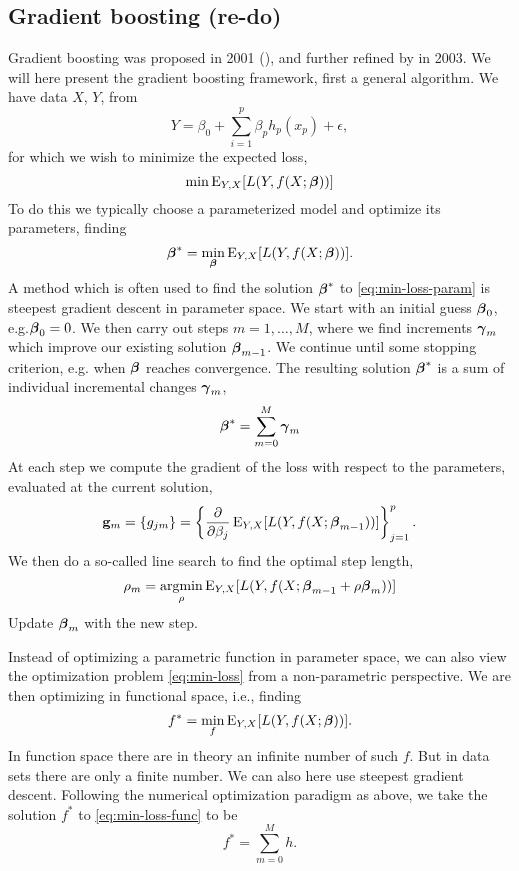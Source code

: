 \subsection*{Gradient boosting (re-do)}
Gradient boosting was proposed in 2001 (\cite{friedman2001}), and further refined by \cite{buhlmann-yu} in 2003. We will here present the gradient boosting framework, first a general algorithm.
We have data $X$, $Y$, from
\begin{equation}\label{eq:gam2}
    Y=\beta_0+\sum_{i=1}^p \beta_p h_p(x_p)+\epsilon,
\end{equation}
for which we wish to minimize the expected loss,
\begin{equation}\label{eq:min-loss}
    \min\operatorname{E}_{Y,X}[L(Y,f(X;\boldsymbol{\beta}))]
\end{equation}
To do this we typically choose a parameterized model and optimize its parameters, finding
\begin{equation}\label{eq:min-loss-param}
    \boldsymbol{\beta}^*=\underset{\boldsymbol{\beta}}{\min}\operatorname{E}_{Y,X}[L(Y,f(X;\boldsymbol{\beta}))].
\end{equation}
A method which is often used to find the solution $\boldsymbol{\beta}^*$ to \eqref{eq:min-loss-param} is steepest gradient descent in parameter space. We start with an initial guess $\boldsymbol{\beta}_0$, e.g.$\boldsymbol{\beta}_0=0$. We then carry out steps $m=1,\dotsc,M$, where we find increments $\boldsymbol{\gamma}_m$ which improve our existing solution $\boldsymbol{\beta}_{m-1}$. We continue until some stopping criterion, e.g. when $\boldsymbol{\beta}$ reaches convergence. The resulting solution $\boldsymbol{\beta}^*$ is a sum of individual incremental changes $\boldsymbol{\gamma}_m$,
\begin{equation}
    \boldsymbol{\beta}^*=\sum_{m=0}^M\boldsymbol{\gamma}_m
\end{equation}
At each step we compute the gradient of the loss with respect to the parameters, evaluated at the current solution,
\begin{equation}
    \mathbf{g}_m=\{g_{jm}\}=\left\{\frac{\partial}{\partial\beta_j}\operatorname{E}_{Y,X}[L(Y,f(X;\boldsymbol{\beta}_{m-1}))]\right\}_{j=1}^{p}.
\end{equation}
We then do a so-called line search to find the optimal step length,
\begin{equation}
    \rho_m=\underset{\rho}{\operatorname{argmin}}\operatorname{E}_{Y,X}[L(Y,f(X;\boldsymbol{\beta}_{m-1}+\rho\boldsymbol{\beta}_m))]
\end{equation}
Update $\boldsymbol{\beta}_m$ with the new step.

Instead of optimizing a parametric function in parameter space, we can also view the optimization problem \eqref{eq:min-loss} from a non-parametric perspective. We are then optimizing in functional space, i.e., finding
\begin{equation}\label{eq:min-loss-func}
    f^*=\underset{f}{\min}\operatorname{E}_{Y,X}[L(Y,f(X;\boldsymbol{\beta}))].
\end{equation}
In function space there are in theory an infinite number of such $f$. But in data sets there are only a finite number. We can also here use steepest gradient descent. Following the numerical optimization paradigm as above, we take the solution $f^*$ to \eqref{eq:min-loss-func} to be
\begin{equation}
    f^*=\sum_{m=0}^Mh.
\end{equation}